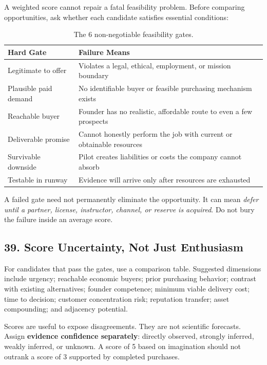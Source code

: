 A weighted score cannot repair a fatal feasibility problem. Before comparing opportunities, ask whether each candidate satisfies essential conditions:

\begin{table}[htbp]
\centering
\small
\begin{tabularx}{\columnwidth}{l X}
\toprule
\textbf{Hard Gate} & \textbf{Failure Means} \\
\midrule
Legitimate to offer & Violates a legal, ethical, employment, or mission boundary \\
Plausible paid demand & No identifiable buyer or feasible purchasing mechanism exists \\
Reachable buyer & Founder has no realistic, affordable route to even a few prospects \\
Deliverable promise & Cannot honestly perform the job with current or obtainable resources \\
Survivable downside & Pilot creates liabilities or costs the company cannot absorb \\
Testable in runway & Evidence will arrive only after resources are exhausted \\
\bottomrule
\end{tabularx}
\caption{The 6 non-negotiable feasibility gates.}
\label{tab:ch7-hard-gates}
\end{table}

A failed gate need not permanently eliminate the opportunity. It can mean \emph{defer until a partner, license, instructor, channel, or reserve is acquired}. Do not bury the failure inside an average score.

\subsection*{39. Score Uncertainty, Not Just Enthusiasm}

For candidates that pass the gates, use a comparison table. Suggested dimensions include urgency; reachable economic buyers; prior purchasing behavior; contrast with existing alternatives; founder competence; minimum viable delivery cost; time to decision; customer concentration risk; reputation transfer; asset compounding; and adjacency potential.

Scores are useful to expose disagreements. They are not scientific forecasts. Assign \textbf{evidence confidence separately}: directly observed, strongly inferred, weakly inferred, or unknown. A score of 5 based on imagination should not outrank a score of 3 supported by completed purchases.

